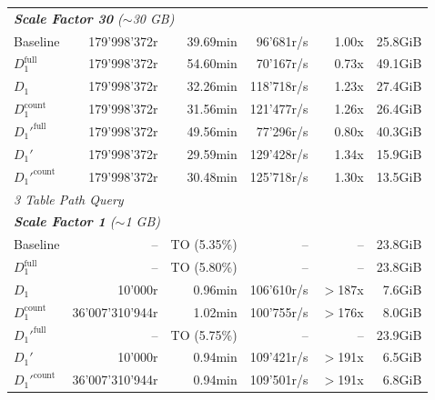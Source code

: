 \begin{longtable}{lrrrrr}
    \multicolumn{6}{l}{\textit{\textbf{Scale Factor 30} ($\sim$30 GB)}} \\
    \nopagebreak
    Baseline              &  179'998'372r         &  39.69min            &  96'681r/s           & 1.00x             & 25.8GiB   \\
    $D_1^{\text{full}}$   &  179'998'372r         &  54.60min            &  70'167r/s           & 0.73x             & 49.1GiB   \\
    \quad $D_1$           &  179'998'372r         &  32.26min            &  118'718r/s          & 1.23x             & 27.4GiB   \\
    $D_1^{\text{count}}$  &  179'998'372r         &  31.56min            &  121'477r/s          & 1.26x             & 26.4GiB   \\
    $D_1'^{\text{full}}$  &  179'998'372r         &  49.56min            &  77'296r/s           & 0.80x             & 40.3GiB   \\
    \quad $D_1'$          &  179'998'372r         &  29.59min            &  129'428r/s          & 1.34x             & 15.9GiB   \\
    $D_1'^{\text{count}}$ &  179'998'372r         &  30.48min            &  125'718r/s          & 1.30x             & 13.5GiB   \\
    \midrule

    \multicolumn{6}{l}{\textit{3 Table Path Query}} \\
    \midrule
    \multicolumn{6}{l}{\textit{\textbf{Scale Factor 1} ($\sim$1 GB)}} \\
    \nopagebreak
    Baseline              &  --                   &  TO (5.35\%)         &  --                  & --                & 23.8GiB   \\
    $D_1^{\text{full}}$   &  --                   &  TO (5.80\%)         &  --                  & --                & 23.8GiB   \\
    \quad $D_1$           &  10'000r              &  0.96min             &  106'610r/s          & $>$187x           & 7.6GiB    \\
    $D_1^{\text{count}}$  &  36'007'310'944r      &  1.02min             &  100'755r/s          & $>$176x           & 8.0GiB    \\
    $D_1'^{\text{full}}$  &  --                   &  TO (5.75\%)         &  --                  & --                & 23.9GiB   \\
    \quad $D_1'$          &  10'000r              &  0.94min             &  109'421r/s          & $>$191x           & 6.5GiB    \\
    $D_1'^{\text{count}}$ &  36'007'310'944r      &  0.94min             &  109'501r/s          & $>$191x           & 6.8GiB    \\
    \midrule
    

\end{longtable}
